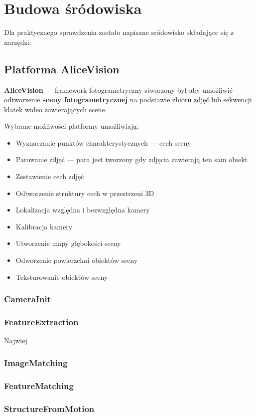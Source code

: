 \chapter{Budowa śródowiska}

Dla praktycznego sprawdzenia zostało napisane sródowisko składające się z narzędzi:

\section{Platforma AliceVision}

\textbf{AliceVision} --- framework fotogrametryczny stworzony był aby umożliwić odtworzenie \textbf{sceny fotogrametrycznej} na podstawie zbioru zdjęć lub sekwencji klatek wideo zawierających scene.

Wybrane możliwości platformy umożliwiają:
\begin{itemize}
\item Wyznaczanie punktów charakterystycznych --- cech sceny
\item Parowanie zdjęć --- para jest tworzony gdy zdjęcia zawierają ten sam obiekt
\item Zestawienie cech zdjęć
\item Odtworzenie struktury cech w przestrzeni 3D
\item Lokalizacja względna i bezwzględna kamery
\item Kalibracja kamery
\item Utworzenie mapy głębokości sceny
\item Odworzenie powierzchni obiektów sceny
\item Teksturowanie obiektów sceny
\end{itemize}

\subsection{CameraInit}
\subsection{FeatureExtraction}
Najwiej
\subsection{ImageMatching}
\subsection{FeatureMatching}
\subsection{StructureFromMotion}
